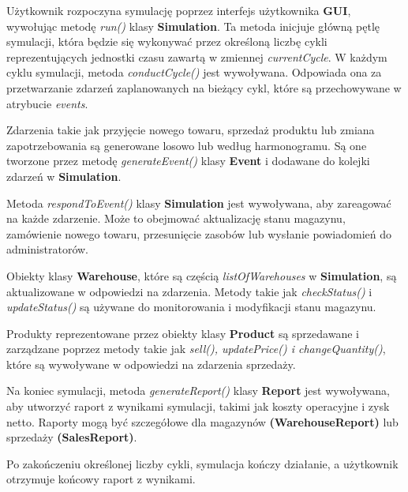 \documentclass[11pt]{article}
\begin{document}
Użytkownik rozpoczyna symulację poprzez interfejs użytkownika \textbf{GUI}, wywołując metodę \textit{run()} klasy \textbf{Simulation}. Ta metoda inicjuje główną pętlę symulacji, która będzie się wykonywać przez określoną liczbę cykli reprezentujących jednostki czasu zawartą w zmiennej \textit{currentCycle}. W każdym cyklu symulacji, metoda \textit{conductCycle()} jest wywoływana. Odpowiada ona za przetwarzanie zdarzeń zaplanowanych na bieżący cykl, które są przechowywane w atrybucie \textit{events}. \par
Zdarzenia takie jak przyjęcie nowego towaru, sprzedaż produktu lub zmiana zapotrzebowania są generowane losowo lub według harmonogramu. Są one tworzone przez metodę \textit{generateEvent()} klasy \textbf{Event} i dodawane do kolejki zdarzeń w \textbf{Simulation}.\par
Metoda \textit{respondToEvent()} klasy \textbf{Simulation} jest wywoływana, aby zareagować na każde zdarzenie. Może to obejmować aktualizację stanu magazynu, zamówienie nowego towaru, przesunięcie zasobów lub wysłanie powiadomień do administratorów.\par
Obiekty klasy \textbf{Warehouse}, które są częścią \textit{listOfWarehouses} w \textbf{Simulation}, są aktualizowane w odpowiedzi na zdarzenia. Metody takie jak \textit{checkStatus()} i \textit{updateStatus()} są używane do monitorowania i modyfikacji stanu magazynu.\par
Produkty reprezentowane przez obiekty klasy \textbf{Product} są sprzedawane i zarządzane poprzez metody takie jak \textit{sell(), updatePrice() i changeQuantity()}, które są wywoływane w odpowiedzi na zdarzenia sprzedaży.\par
Na koniec symulacji, metoda \textit{generateReport()} klasy \textbf{Report} jest wywoływana, aby utworzyć raport z wynikami symulacji, takimi jak koszty operacyjne i zysk netto. Raporty mogą być szczegółowe dla magazynów \textbf{(WarehouseReport)} lub sprzedaży \textbf{(SalesReport)}.\par
Po zakończeniu określonej liczby cykli, symulacja kończy działanie, a użytkownik otrzymuje końcowy raport z wynikami.
\end{document}
